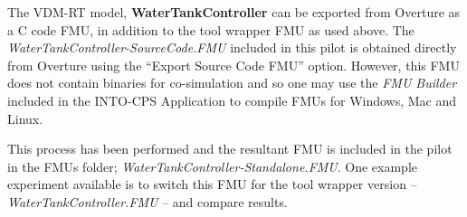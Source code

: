 The VDM-RT model, \textbf{WaterTankController} can be exported from Overture as a C code FMU, in addition to the tool wrapper FMU as used above. The \emph{WaterTankController-SourceCode.FMU} included in this pilot is obtained directly from Overture using the ``Export Source Code FMU'' option. However, this FMU does not contain binaries for co-simulation and so one may use the \emph{FMU Builder} included in the INTO-CPS Application to compile FMUs for Windows, Mac and Linux. 

This process has been performed and the resultant FMU is included in the pilot in the FMUs folder; \emph{WaterTankController-Standalone.FMU}. One example experiment available is to switch this FMU for the tool wrapper version -- \emph{WaterTankController.FMU} -- and compare results. 
